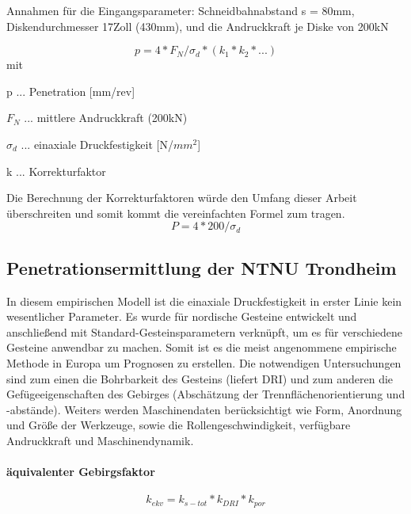 Annahmen für die Eingangsparameter: Schneidbahnabstand s = 80mm, Diskendurchmesser 17Zoll (430mm), und die Andruckkraft je Diske von 200kN

\begin{equation}
\label{eg:gehring}
p=4*F_{N}/\sigma_{d}*(k_{1}*k_{2}*...)
\end{equation}
mit
\begin{description}[labelindent=1cm]
\item[] p ... Penetration [mm/rev]
\item[] $F_{N}$ ... mittlere Andruckkraft (200kN)
\item[] $\sigma_{d}$ ... einaxiale Druckfestigkeit [N/$mm^{2}$]
\item[] k ... Korrekturfaktor
\end{description}

%
Die Berechnung der Korrekturfaktoren würde den Umfang dieser Arbeit überschreiten und somit kommt die vereinfachten Formel zum tragen. 
\
\begin{equation}
\label{eg:gehringeinfach}
P=4*200/\sigma_{d}
\end{equation}

\subsection{Penetrationsermittlung der NTNU Trondheim}
\label{penetration_ntnu}
In diesem empirischen Modell ist die einaxiale Druckfestigkeit in erster Linie kein wesentlicher Parameter. Es wurde für nordische Gesteine entwickelt und anschließend mit Standard-Gesteinsparametern verknüpft, um es für verschiedene Gesteine anwendbar zu machen. Somit ist es die meist angenommene empirische Methode in Europa um Prognosen zu erstellen.
Die notwendigen Untersuchungen sind zum einen die Bohrbarkeit des Gesteins (liefert DRI) und zum anderen die Gefügeeigenschaften des Gebirges (Abschätzung der Trennflächenorientierung und -abstände). Weiters werden Maschinendaten berücksichtigt wie Form, Anordnung und Größe der Werkzeuge, sowie die Rollengeschwindigkeit, verfügbare Andruckkraft und Maschinendynamik.

\paragraph{äquivalenter Gebirgsfaktor}
\begin{equation}
\label{eg:gebirgsfaktor}
k_{ekv}=k_{s-tot}*k_{DRI}*k_{por}
\end{equation}

